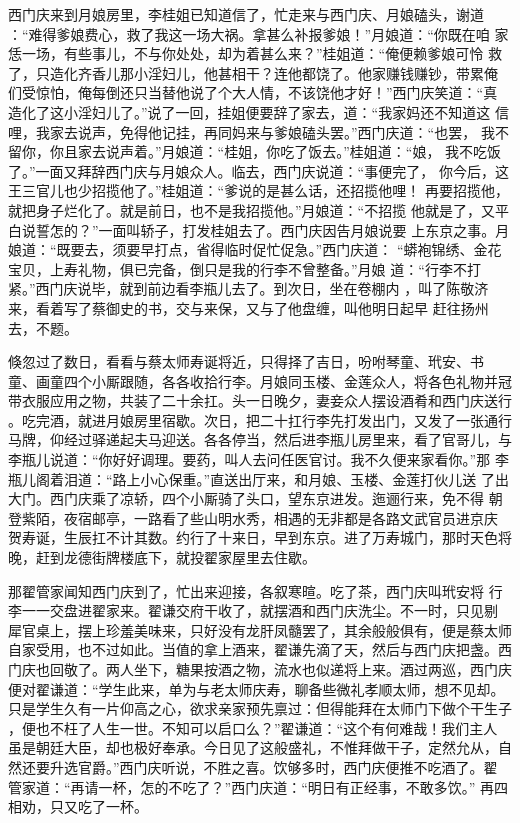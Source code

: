 西门庆来到月娘房里，李桂姐已知道信了，忙走来与西门庆、月娘磕头，谢道
：“难得爹娘费心，救了我这一场大祸。拿甚么补报爹娘！”月娘道：“你既在咱
家恁一场，有些事儿，不与你处处，却为着甚么来？”桂姐道：“俺便赖爹娘可怜
救了，只造化齐香儿那小淫妇儿，他甚相干？连他都饶了。他家赚钱赚钞，带累俺
们受惊怕，俺每倒还只当替他说了个大人情，不该饶他才好！”西门庆笑道：“真
造化了这小淫妇儿了。”说了一回，挂姐便要辞了家去，道：“我家妈还不知道这
信哩，我家去说声，免得他记挂，再同妈来与爹娘磕头罢。”西门庆道：“也罢，
我不留你，你且家去说声着。”月娘道：“桂姐，你吃了饭去。”桂姐道：“娘，
我不吃饭了。”一面又拜辞西门庆与月娘众人。临去，西门庆说道：“事便完了，
你今后，这王三官儿也少招揽他了。”桂姐道：“爹说的是甚么话，还招揽他哩！
再要招揽他，就把身子烂化了。就是前日，也不是我招揽他。”月娘道：“不招揽
他就是了，又平白说誓怎的？”一面叫轿子，打发桂姐去了。西门庆因告月娘说要
上东京之事。月娘道：“既要去，须要早打点，省得临时促忙促急。”西门庆道：
“蟒袍锦绣、金花宝贝，上寿礼物，俱已完备，倒只是我的行李不曾整备。”月娘
道：“行李不打紧。”西门庆说毕，就到前边看李瓶儿去了。到次日，坐在卷棚内
，叫了陈敬济来，看着写了蔡御史的书，交与来保，又与了他盘缠，叫他明日起早
赶往扬州去，不题。

倏忽过了数日，看看与蔡太师寿诞将近，只得择了吉日，吩咐琴童、玳安、书
童、画童四个小厮跟随，各各收拾行李。月娘同玉楼、金莲众人，将各色礼物并冠
带衣服应用之物，共装了二十余扛。头一日晚夕，妻妾众人摆设酒肴和西门庆送行
。吃完酒，就进月娘房里宿歇。次日，把二十扛行李先打发出门，又发了一张通行
马牌，仰经过驿递起夫马迎送。各各停当，然后进李瓶儿房里来，看了官哥儿，与
李瓶儿说道：“你好好调理。要药，叫人去问任医官讨。我不久便来家看你。”那
李瓶儿阁着泪道：“路上小心保重。”直送出厅来，和月娘、玉楼、金莲打伙儿送
了出大门。西门庆乘了凉轿，四个小厮骑了头口，望东京进发。迤逦行来，免不得
朝登紫陌，夜宿邮亭，一路看了些山明水秀，相遇的无非都是各路文武官员进京庆
贺寿诞，生辰扛不计其数。约行了十来日，早到东京。进了万寿城门，那时天色将
晚，赶到龙德街牌楼底下，就投翟家屋里去住歇。

那翟管家闻知西门庆到了，忙出来迎接，各叙寒暄。吃了茶，西门庆叫玳安将
行李一一交盘进翟家来。翟谦交府干收了，就摆酒和西门庆洗尘。不一时，只见剔
犀官桌上，摆上珍羞美味来，只好没有龙肝凤髓罢了，其余般般俱有，便是蔡太师
自家受用，也不过如此。当值的拿上酒来，翟谦先滴了天，然后与西门庆把盏。西
门庆也回敬了。两人坐下，糖果按酒之物，流水也似递将上来。酒过两巡，西门庆
便对翟谦道：“学生此来，单为与老太师庆寿，聊备些微礼孝顺太师，想不见却。
只是学生久有一片仰高之心，欲求亲家预先禀过：但得能拜在太师门下做个干生子
，便也不枉了人生一世。不知可以启口么？”翟谦道：“这个有何难哉！我们主人
虽是朝廷大臣，却也极好奉承。今日见了这般盛礼，不惟拜做干子，定然允从，自
然还要升选官爵。”西门庆听说，不胜之喜。饮够多时，西门庆便推不吃酒了。翟
管家道：“再请一杯，怎的不吃了？”西门庆道：“明日有正经事，不敢多饮。”
再四相劝，只又吃了一杯。

